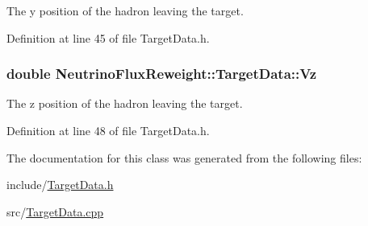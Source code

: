 The y position of the hadron leaving the target. 



Definition at line 45 of file Target\-Data.\-h.

\hypertarget{class_neutrino_flux_reweight_1_1_target_data_aadca38c0925febfae9eab62622a56537}{
\subsubsection[{Vz}]{\setlength{\rightskip}{0pt plus 5cm}double Neutrino\-Flux\-Reweight\-::\-Target\-Data\-::\-Vz}}\label{class_neutrino_flux_reweight_1_1_target_data_aadca38c0925febfae9eab62622a56537}


The z position of the hadron leaving the target. 



Definition at line 48 of file Target\-Data.\-h.



The documentation for this class was generated from the following files\-:\begin{DoxyCompactItemize}
\item 
include/\hyperlink{_target_data_8h}{Target\-Data.\-h}\item 
src/\hyperlink{_target_data_8cpp}{Target\-Data.\-cpp}\end{DoxyCompactItemize}
